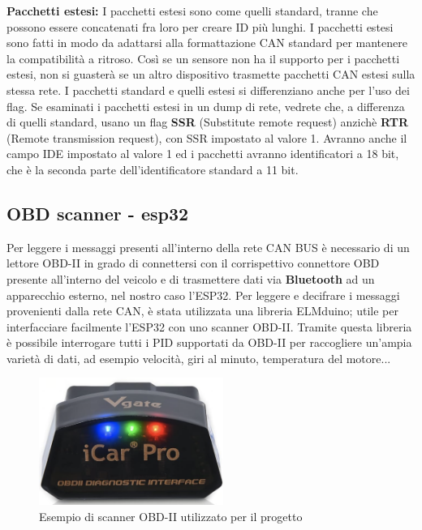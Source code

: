 \documentclass[12pt, a4paper, italian]{report}
\numberwithin{figure}{chapter}
\numberwithin{table}{chapter}
\begin{document}
\textbf{Pacchetti estesi:}
I pacchetti estesi sono come quelli standard, tranne che possono essere concatenati fra loro per creare ID più lunghi. I pacchetti estesi sono fatti in modo da adattarsi alla formattazione CAN standard per mantenere la compatibilità a ritroso. Così se un sensore non ha il supporto per i pacchetti estesi, non si guasterà se un altro dispositivo trasmette pacchetti CAN estesi sulla stessa rete. I pacchetti standard e quelli estesi si differenziano anche per l'uso dei flag. Se esaminati i pacchetti estesi in un dump di rete, vedrete che, a differenza di quelli standard, usano un flag \textbf{SSR} (Substitute remote request) anzichè \textbf{RTR} (Remote transmission request), con SSR impostato al valore 1. Avranno anche il campo IDE impostato al valore 1 ed i pacchetti avranno identificatori a 18 bit, che è la seconda parte dell'identificatore standard a 11 bit.

\subsection{OBD scanner - esp32}
Per leggere i messaggi presenti all'interno della rete CAN BUS è necessario di un lettore OBD-II in grado di connettersi con il corrispettivo connettore OBD presente all'interno del veicolo e di trasmettere dati via \textbf{Bluetooth} ad un apparecchio esterno, nel nostro caso l'ESP32. Per leggere e decifrare i messaggi provenienti dalla rete CAN, è stata utilizzata una libreria ELMduino; utile per interfacciare facilmente l'ESP32 con uno scanner OBD-II. Tramite questa libreria è possibile interrogare tutti i PID supportati da OBD-II per raccogliere un'ampia varietà di dati, ad esempio velocità, giri al minuto, temperatura del motore...

\begin{figure}[h]
  \centering
  \includegraphics[width=6cm]{LettoreScannerOBD-II.png}
  \caption{Esempio di scanner OBD-II utilizzato per il progetto}
  \label{fig:scannerOBD-II}
\end{figure}
\end{document}
